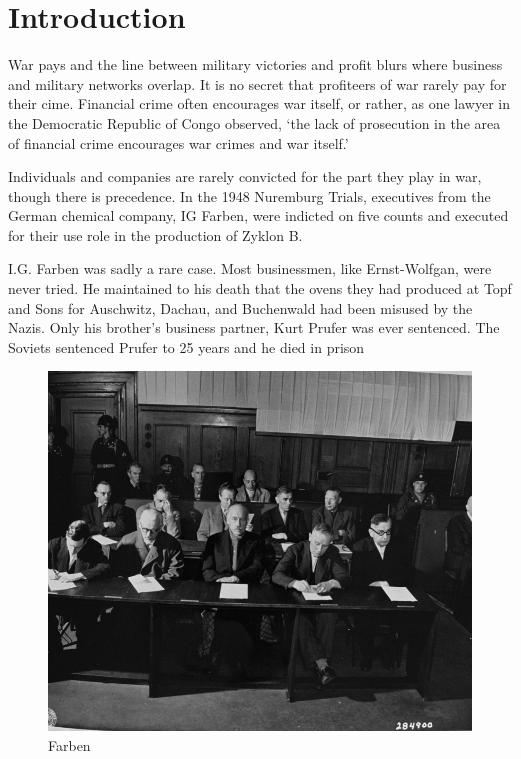 \hypertarget{introduction}{%
\section{Introduction}\label{introduction}}

War pays and the line between military victories and profit blurs where
business and military networks overlap. It is no secret that profiteers
of war rarely pay for their cime. Financial crime often encourages war
itself, or rather, as one lawyer in the Democratic Republic of Congo
observed, `the lack of prosecution in the area of financial crime
encourages war crimes and war itself.'

Individuals and companies are rarely convicted for the part they play in
war, though there is precedence. In the 1948 Nuremburg Trials,
executives from the German chemical company, IG Farben, were indicted on
five counts and executed for their use role in the production of Zyklon
B.

I.G. Farben was sadly a rare case. Most businessmen, like Ernst-Wolfgan,
were never tried. He maintained to his death that the ovens they had
produced at Topf and Sons for Auschwitz, Dachau, and Buchenwald had been
misused by the Nazis. Only his brother's business partner, Kurt Prufer
was ever sentenced. The Soviets sentenced Prufer to 25 years and he died
in prison

\begin{figure}
\centering
\includegraphics{../assets/IG_FARBEN.jpg}
\caption{Farben}
\end{figure}

